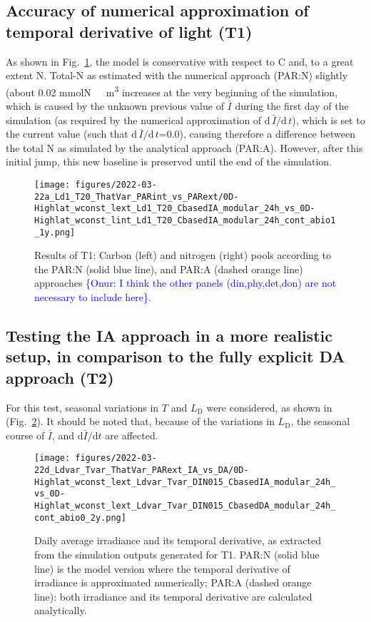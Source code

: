 \documentclass[gmd, manuscript]{copernicus}
\newcommand{\onur}[1]{\textcolor{blue}{\{Onur: #1\}}}
\begin{document}
\subsection{Accuracy of numerical approximation of temporal derivative of light (T1)}
As shown in Fig.~\ref{f.T1res}, the model is conservative with respect to C and, to a great extent N\@. Total-N as estimated with the numerical approach (PAR:N) slightly (about 0.02 \unit{mmolN\ m^3} increases at the very beginning of the simulation, which is caused by the unknown previous value of $\bar{I}$ during the first day of the simulation (as required by the numerical approximation of $\text{d}\,\bar{I}/\text{d}\,t$), which is set to the current value (such that $\text{d}\,\bar{I}/\text{d}\,t$=0.0), causing therefore a difference between the total N as simulated by the analytical approach (PAR:A). However, after this initial jump, this new baseline is preserved until the end of the simulation.

\begin{figure}[ht!]
\texttt{[image: figures/2022-03-22a\_Ld1\_T20\_ThatVar\_PARint\_vs\_PARext/0D-Highlat\_wconst\_lext\_Ld1\_T20\_CbasedIA\_modular\_24h\_vs\_0D-Highlat\_wconst\_lint\_Ld1\_T20\_CbasedIA\_modular\_24h\_cont\_abio1\_1y.png]}
\caption{Results of T1: Carbon (left) and nitrogen (right) pools according to the PAR:N (solid blue line), and PAR:A (dashed orange line) approaches \onur{I think the other panels (din,phy,det,don) are not necessary to include here}.\label{f.T1res}}
\end{figure}

\FloatBarrier

\subsection{Testing the IA approach in a more realistic setup, in comparison to the fully explicit DA approach (T2)}

For this test, seasonal variations in $T$ and $L_{\text{D}}$ were considered, as shown in (Fig.~\ref{f.T2env}). It should be noted that, because of the variations in $L_{\text{D}}$, the seasonal course of $\bar{I}$, and $\text{d}\bar{I}/\text{d}t$ are affected.

\begin{figure}[ht!]
  \texttt{[image: figures/2022-03-22d\_Ldvar\_Tvar\_ThatVar\_PARext\_IA\_vs\_DA/0D-Highlat\_wconst\_lext\_Ldvar\_Tvar\_DIN015\_CbasedIA\_modular\_24h\_vs\_0D-Highlat\_wconst\_lext\_Ldvar\_Tvar\_DIN015\_CbasedDA\_modular\_24h\_cont\_abio0\_2y.png]}
  \caption{Daily average irradiance and its temporal derivative, as extracted from the simulation outputs generated for T1. PAR:N (solid blue line) is the model version where the temporal derivative of irradiance is approximated numerically; PAR:A (dashed orange line): both irradiance and its temporal derivative are calculated analytically.\label{f.T2env}}
\end{figure}
    
\end{document}
